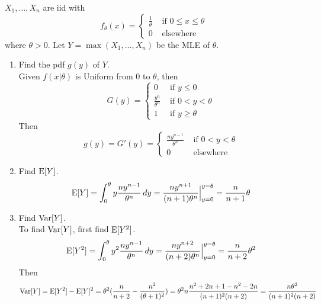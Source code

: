 \documentclass[12pt]{article}
\begin{document}
\begin{question} $X_1,\dots,X_n$ are iid with $$f_\theta(x) = \begin{cases} \frac{1}{\theta} &\text{ if } 0 \leq x \leq \theta \\ 0 &\text{ elsewhere} \end{cases} $$ where $\theta > 0$. Let $Y = \max(X_1,\dots,X_n)$ be the MLE of $\theta$. 
\begin{enumerate} 
\item Find the pdf $g(y)$ of $Y$. \\
Given $f(x|\theta)$ is Uniform from $0$ to $\theta$, then $$ G(y) = \begin{cases} 0 &\text{ if } y \leq 0 \\ \frac{y^n}{\theta^n} &\text{ if } 0 < y < \theta \\ 1 &\text{ if } y \geq \theta \end{cases} $$ 
Then $$ g(y) = G'(y) = \begin{cases} \frac{ny^{n-1}}{\theta^n} &\text{ if } 0 < y < \theta \\ 0 &\text{ elsewhere } \end{cases} $$ 
\item Find $\mathrm{E}[ Y ]$.
$$ \mathrm{E}[ Y ] = \int_0^\theta y \frac{ny^{n-1}}{\theta^n} \, dy = \frac{ny^{n+1}}{(n+1)\theta^n}\Big|_{y=0}^{y=\theta} = \frac{n}{n+1}\theta $$ 
\item Find $\mathrm{Var}[ Y ]$. \\
To find $\mathrm{Var}[ Y ]$, first find $\mathrm{E}[ Y^2 ]$. $$ \mathrm{E}[ Y^2 ] = \int_0^\theta y^2 \frac{ny^{n-1}}{\theta^n} \, dy = \frac{ny^{n+2}}{(n+2)\theta^n}\Big|_{y = 0}^{y = \theta} = \frac{n}{n+2}\theta^2 $$ 
Then $$ \mathrm{Var}[ Y ] = \mathrm{E}[ Y^2 ] - \mathrm{E}[ Y ]^2 = \theta^2( \frac{n}{n+2} - \frac{n^2}{(\theta+1)^2}) = \theta^2n \frac{n^2 + 2n + 1 - n^2 - 2n}{(n+1)^2(n+2)} = \frac{n\theta^2}{(n+1)^2(n+2)} $$ 
\end{enumerate} 
\end{question} 
\end{document}
